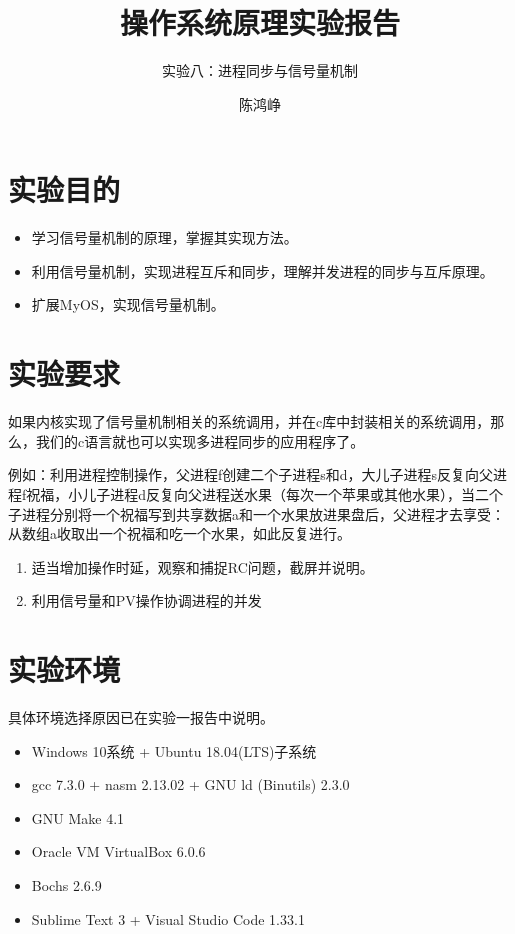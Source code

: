 \documentclass[logo,reportComp]{thesis}
\title{操作系统原理实验报告}
\subtitle{实验八：进程同步与信号量机制}
\author{陈鸿峥}
\begin{document}
\maketitle

\section{实验目的}
\begin{itemize}
	\item 学习信号量机制的原理，掌握其实现方法。
	\item 利用信号量机制，实现进程互斥和同步，理解并发进程的同步与互斥原理。
	\item 扩展MyOS，实现信号量机制。
\end{itemize}

\section{实验要求}
如果内核实现了信号量机制相关的系统调用，并在c库中封装相关的系统调用，那么，我们的c语言就也可以实现多进程同步的应用程序了。

例如：利用进程控制操作，父进程f创建二个子进程s和d，大儿子进程s反复向父进程f祝福，小儿子进程d反复向父进程送水果（每次一个苹果或其他水果），当二个子进程分别将一个祝福写到共享数据a和一个水果放进果盘后，父进程才去享受：从数组a收取出一个祝福和吃一个水果，如此反复进行。
\begin{enumerate}
	\item 适当增加操作时延，观察和捕捉RC问题，截屏并说明。
	\item 利用信号量和PV操作协调进程的并发
\end{enumerate}

\section{实验环境}
具体环境选择原因已在实验一报告中说明。
\begin{itemize}
	\item Windows 10系统 + Ubuntu 18.04(LTS)子系统
	\item gcc 7.3.0 + nasm 2.13.02 + GNU ld (Binutils) 2.3.0
	\item GNU Make 4.1
	\item Oracle VM VirtualBox 6.0.6
	\item Bochs 2.6.9
	\item Sublime Text 3 + Visual Studio Code 1.33.1
\end{itemize}
\end{document}
